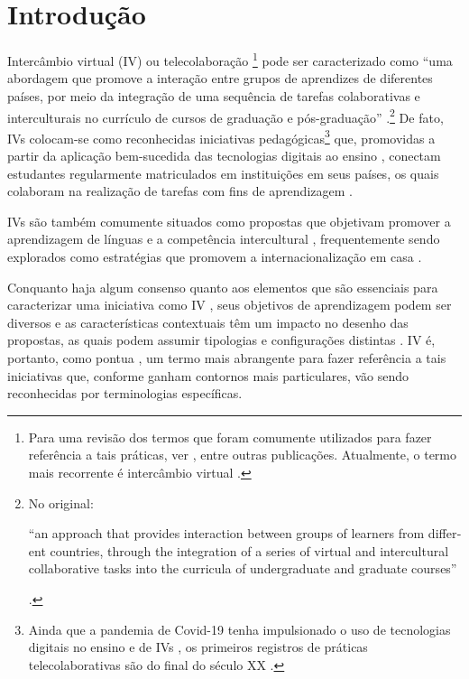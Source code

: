 \documentclass[portuguese]{textolivre}
\begin{document}
\section{Introdução}\label{introducao}
Intercâmbio virtual (IV) ou telecolaboração \footnote{Para uma revisão dos termos que foram comumente utilizados para fazer referência a tais práticas, ver \textcite{odowd2018}, entre outras publicações. Atualmente, o termo mais recorrente é intercâmbio virtual \cite{odowd2021}.} pode ser caracterizado como “uma abordagem que promove a interação entre grupos de aprendizes de diferentes países, por meio da integração de uma sequência de tarefas colaborativas e interculturais no currículo de cursos de graduação e pós-graduação” 
\cite[p. v, tradução própria]{ramoscarvalho2023}.\footnote{No original: \begin{english}“an approach that provides interaction between groups of learners from different countries, through the integration of a series of virtual and intercultural collaborative tasks into the curricula of undergraduate and graduate courses”\end{english} \cite[p. v]{ramoscarvalho2023}.} De fato, IVs colocam-se como reconhecidas iniciativas pedagógicas\footnote{Ainda que a pandemia de Covid-19 tenha impulsionado o uso de tecnologias digitais no ensino \cite{athanasiou2024} e de IVs \cite{dooly2022,helm2020,rubin2023,}, os primeiros registros de práticas telecolaborativas são do final do século XX \cite{warschauer1996}.} que, promovidas a partir da aplicação bem-sucedida das tecnologias digitais ao ensino \cite{aranha2023}, conectam estudantes regularmente matriculados em instituições em seus países, os quais colaboram na realização de tarefas com fins de aprendizagem \cite{barbosa2023, cavalari2018, dooly2022, sadler2016}.

IVs são também comumente situados como propostas que objetivam promover a aprendizagem de línguas e a competência intercultural \cite{bozhinova2024, gonzalez-lloret2024, lewis2016, oliveira2024}, frequentemente sendo explorados como estratégias que promovem a internacionalização em casa \cite{calvo2024, koris2023, lee2022, rubinguth2015, salomao2022}.

Conquanto haja algum consenso quanto aos elementos que são essenciais para caracterizar uma iniciativa como IV \cite{rampazzamoore2024b, stevens2021}, seus objetivos de aprendizagem podem ser diversos e as características contextuais têm um impacto no desenho das propostas, as quais podem assumir tipologias e configurações distintas \cite{anikina2015, bozhinova2024, oliveira2024}. IV é, portanto, como pontua \textcite{rubin2023}, um termo mais abrangente para fazer referência a tais iniciativas que, conforme ganham contornos mais particulares, vão sendo reconhecidas por terminologias específicas.
\end{document}
